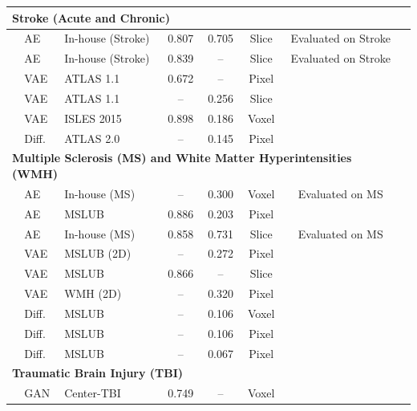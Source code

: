 \begin{longtable}{lp{1.2cm}lccccp{4.5cm}}
\multicolumn{7}{l}{\textbf{Stroke (Acute and Chronic)}} \\
\midrule
\citet{Luo2023} & AE & In-house (Stroke) & 0.807 & 0.705 & Slice & Evaluated on Stroke\\
\citet{Qu2026} & AE & In-house (Stroke) & 0.839 & -- & Slice & Evaluated on Stroke\\
\citet{Sato2019} & VAE & ATLAS 1.1 & 0.672 & -- & Pixel & \\
\citet{Bengs2021} & VAE & ATLAS 1.1 & -- & 0.256 & Slice & \\
\citet{Lüth2023} & VAE & ISLES 2015 & 0.898 & 0.186 & Voxel & \\
\citet{Bercea2023} & Diff. & ATLAS 2.0 & -- & 0.145 & Pixel & \\
\hline

\multicolumn{7}{l}{\textbf{Multiple Sclerosis (MS) and White Matter Hyperintensities (WMH)}} \\
\midrule
\citet{Baur2021-2} & AE & In-house (MS) & -- & 0.300 & Voxel & Evaluated on MS \\
\citet{Ghorbel2023} & AE & MSLUB & 0.886 & 0.203 & Pixel & \\
\citet{Luo2023} & AE & In-house (MS) & 0.858 & 0.731 & Slice & Evaluated on MS\\
\citet{Pinaya2022-2} & VAE & MSLUB (2D)& -- & 0.272 & Pixel & \\
\citet{Pinaya2022-2} & VAE & MSLUB & 0.866 & -- & Slice & \\
\citet{Pinaya2022-2} & VAE & WMH (2D)& -- & 0.320 & Pixel & \\
\citet{Behrendt2023} & Diff. & MSLUB & -- & 0.106 & Voxel & \\
\citet{Iqbal2023} & Diff. & MSLUB & -- & 0.106 & Pixel & \\
\citet{Kumar2024} & Diff. & MSLUB & -- & 0.067 & Pixel & \\
\hline

\multicolumn{7}{l}{\textbf{Traumatic Brain Injury (TBI)}} \\
\midrule
\citet{Simarro2020} & GAN & Center-TBI & 0.749 & -- & Voxel & \\
\end{longtable}